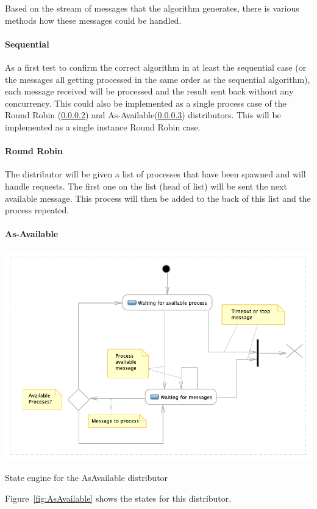 \documentclass[a4paper,11pt]{report}
\begin{document}
Based on the stream of messages that the algorithm generates, there is
various methods how these messages could be handled.

\paragraph{Sequential}
\label{sec:sequential}

As a first test to confirm the correct algorithm in at least the
sequential case (or the messages all getting processed in the same
order as the sequential algorithm), each message received will be
processed and the result sent back without any concurrency. This could
also be implemented as a single process case of the Round Robin
(\ref{sec:round-robin}) and As-Available(\ref{sec:as-available})
distributors. This will be implemented as a single instance Round Robin case.

\paragraph{Round Robin}
\label{sec:round-robin}

The distributor will be given a list of processes that have been
spawned and will handle requests. The first one on the list (head of
list) will be sent the next available message. This process will then
be added to the back of this list and the process repeated.

\paragraph{As-Available}
\label{sec:as-available}
\begin{Figure}[htb] %
	 \centering
	 \includegraphics[scale=1]{AsAvailable_states.pdf} 
	 \caption{State engine for the AsAvailable distributor}
	 \label{fig:AsAvailable}
\end{Figure}
Figure~\ref{fig:AsAvailable} shows the states for this distributor.
\end{document}
